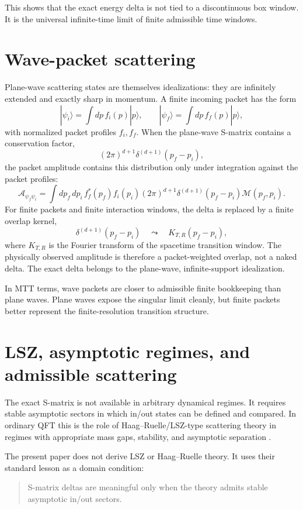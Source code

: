 \documentclass[11pt]{article}
\begin{document}
This shows that the exact energy delta is not tied to a discontinuous box window.  It is the universal infinite-time limit of finite admissible time windows.

\section{Wave-packet scattering}

Plane-wave scattering states are themselves idealizations: they are infinitely extended and exactly sharp in momentum.  A finite incoming packet has the form
\[
|\psi_i\rangle=\int dp\, f_i(p)|p\rangle,
\qquad
|\psi_f\rangle=\int dp\, f_f(p)|p\rangle,
\]
with normalized packet profiles \(f_i,f_f\).  When the plane-wave S-matrix contains a conservation factor,
\[
(2\pi)^{d+1}\delta^{(d+1)}(p_f-p_i),
\]
the packet amplitude contains this distribution only under integration against the packet profiles:
\[
\mathcal A_{\psi_f\psi_i}
=
\int dp_f\,dp_i\,
f_f^\ast(p_f)f_i(p_i)
(2\pi)^{d+1}\delta^{(d+1)}(p_f-p_i)\mathcal M(p_f,p_i).
\]
For finite packets and finite interaction windows, the delta is replaced by a finite overlap kernel,
\[
\delta^{(d+1)}(p_f-p_i)
\quad\leadsto\quad
K_{T,R}(p_f-p_i),
\]
where \(K_{T,R}\) is the Fourier transform of the spacetime transition window.  The physically observed amplitude is therefore a packet-weighted overlap, not a naked delta.  The exact delta belongs to the plane-wave, infinite-support idealization.

In MTT terms, wave packets are closer to admissible finite bookkeeping than plane waves.  Plane waves expose the singular limit cleanly, but finite packets better represent the finite-resolution transition structure.

\section{LSZ, asymptotic regimes, and admissible scattering}

The exact S-matrix is not available in arbitrary dynamical regimes.  It requires stable
asymptotic sectors in which in/out states can be defined and compared.  In ordinary QFT this
is the role of Haag--Ruelle/LSZ-type scattering theory in regimes with appropriate mass gaps,
stability, and asymptotic separation \cite{LSZ1955,Ruelle1962}.

The present paper does not derive LSZ or Haag--Ruelle theory.  It uses their standard lesson as a domain condition:

\begin{quote}
S-matrix deltas are meaningful only when the theory admits stable asymptotic in/out sectors.
\end{quote}
\end{document}

